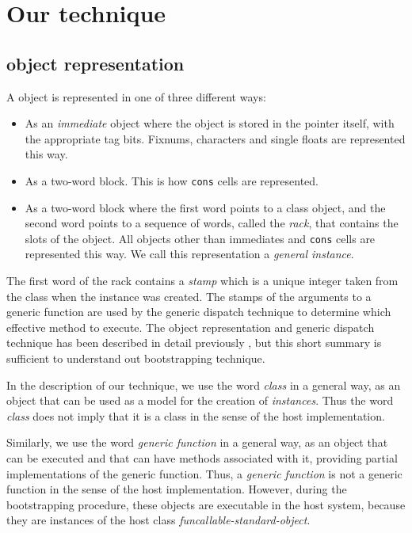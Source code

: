\section{Our technique}
\label{sec-our-technique}

\subsection{\sicl{} object representation}
\label{sec-our-technique-object-representation}

A \sicl{} object is represented in one of three different ways:

\begin{itemize}
\item As an \emph{immediate} object where the object is stored in the
  pointer itself, with the appropriate tag bits.  Fixnums, characters
  and single floats are represented this way.
\item As a two-word block.  This is how \texttt{cons} cells are
  represented.
\item As a two-word block where the first word points to a class
  object, and the second word points to a sequence of words, called
  the \emph{rack}, that contains the slots of the object.  All objects
  other than immediates and \texttt{cons} cells are represented this
  way.  We call this representation a \emph{general instance}. 
\end{itemize}

The first word of the rack contains a \emph{stamp} which is a unique
integer taken from the class when the instance was created.  The
stamps of the arguments to a generic function are used by the generic
dispatch technique to determine which effective method to execute.
The object representation and generic dispatch technique has been
described in detail previously
\cite{Strandh:2014:FGD:2635648.2635654}, but this short summary is
sufficient to understand out bootstrapping technique.

In the description of our technique, we use the word \emph{class} in a
general way, as an object that can be used as a model for the creation
of \emph{instances}.  Thus the word \emph{class} does not imply that
it is a class in the sense of the host \commonlisp{} implementation.

Similarly, we use the word \emph{generic function} in a general way,
as an object that can be executed and that can have methods associated
with it, providing partial implementations of the generic function.
Thus, a \emph{generic function} is not a generic
function in the sense of the host \commonlisp{} implementation.
However, during the bootstrapping procedure, these objects are
executable in the host system, because they are instances of the host
class \emph{funcallable-standard-object}.

